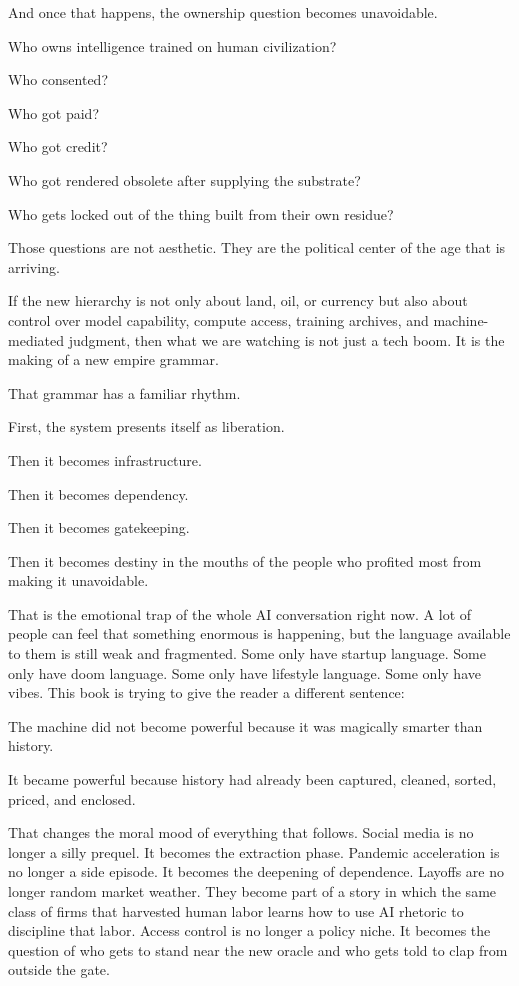 \documentclass[
  american,
  12pt,
  letterpaper,
]{article}
\begin{document}
And once that happens, the ownership question becomes unavoidable.

Who owns intelligence trained on human civilization?

Who consented?

Who got paid?

Who got credit?

Who got rendered obsolete after supplying the substrate?

Who gets locked out of the thing built from their own residue?

Those questions are not aesthetic. They are the political center of the
age that is arriving.

If the new hierarchy is not only about land, oil, or currency but also
about control over model capability, compute access, training archives,
and machine-mediated judgment, then what we are watching is not just a
tech boom. It is the making of a new empire grammar.

That grammar has a familiar rhythm.

First, the system presents itself as liberation.

Then it becomes infrastructure.

Then it becomes dependency.

Then it becomes gatekeeping.

Then it becomes destiny in the mouths of the people who profited most
from making it unavoidable.

That is the emotional trap of the whole AI conversation right now. A lot
of people can feel that something enormous is happening, but the
language available to them is still weak and fragmented. Some only have
startup language. Some only have doom language. Some only have lifestyle
language. Some only have vibes. This book is trying to give the reader a
different sentence:

The machine did not become powerful because it was magically smarter
than history.

It became powerful because history had already been captured, cleaned,
sorted, priced, and enclosed.

That changes the moral mood of everything that follows. Social media is
no longer a silly prequel. It becomes the extraction phase. Pandemic
acceleration is no longer a side episode. It becomes the deepening of
dependence. Layoffs are no longer random market weather. They become
part of a story in which the same class of firms that harvested human
labor learns how to use AI rhetoric to discipline that labor. Access
control is no longer a policy niche. It becomes the question of who gets
to stand near the new oracle and who gets told to clap from outside the
gate.
\end{document}
